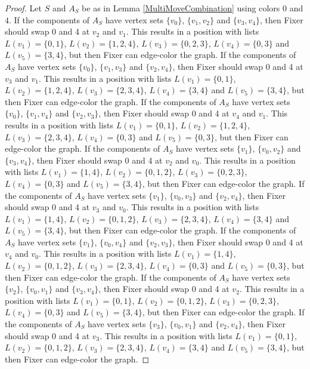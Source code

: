 \documentclass[12pt]{amsart}
\theoremstyle{plain}
\theoremstyle{definition}
\theoremstyle{remark}
\begin{document}
\begin{proof}
Let $S$ and $A_S$ be as in Lemma \ref{MultiMoveCombination} using colors $0$ and $4$. If the components of $A_S$ have vertex sets $\{v_0\}$, $\{v_1, v_2\}$ and $\{v_3, v_4\}$, then Fixer should swap 0 and 4 at $v_2$ and $v_1$. This results in a position with lists $L(v_1) = \{0, 1\}$, $L(v_2) = \{1, 2, 4\}$, $L(v_3) = \{0, 2, 3\}$, $L(v_4) = \{0, 3\}$ and $L(v_5) = \{3, 4\}$, but then Fixer can edge-color the graph.
If the components of $A_S$ have vertex sets $\{v_0\}$, $\{v_1, v_3\}$ and $\{v_2, v_4\}$, then Fixer should swap 0 and 4 at $v_3$ and $v_1$. This results in a position with lists $L(v_1) = \{0, 1\}$, $L(v_2) = \{1, 2, 4\}$, $L(v_3) = \{2, 3, 4\}$, $L(v_4) = \{3, 4\}$ and $L(v_5) = \{3, 4\}$, but then Fixer can edge-color the graph.
If the components of $A_S$ have vertex sets $\{v_0\}$, $\{v_1, v_4\}$ and $\{v_2, v_3\}$, then Fixer should swap 0 and 4 at $v_4$ and $v_1$. This results in a position with lists $L(v_1) = \{0, 1\}$, $L(v_2) = \{1, 2, 4\}$, $L(v_3) = \{2, 3, 4\}$, $L(v_4) = \{0, 3\}$ and $L(v_5) = \{0, 3\}$, but then Fixer can edge-color the graph.
If the components of $A_S$ have vertex sets $\{v_1\}$, $\{v_0, v_2\}$ and $\{v_3, v_4\}$, then Fixer should swap 0 and 4 at $v_2$ and $v_0$. This results in a position with lists $L(v_1) = \{1, 4\}$, $L(v_2) = \{0, 1, 2\}$, $L(v_3) = \{0, 2, 3\}$, $L(v_4) = \{0, 3\}$ and $L(v_5) = \{3, 4\}$, but then Fixer can edge-color the graph.
If the components of $A_S$ have vertex sets $\{v_1\}$, $\{v_0, v_3\}$ and $\{v_2, v_4\}$, then Fixer should swap 0 and 4 at $v_3$ and $v_0$. This results in a position with lists $L(v_1) = \{1, 4\}$, $L(v_2) = \{0, 1, 2\}$, $L(v_3) = \{2, 3, 4\}$, $L(v_4) = \{3, 4\}$ and $L(v_5) = \{3, 4\}$, but then Fixer can edge-color the graph.
If the components of $A_S$ have vertex sets $\{v_1\}$, $\{v_0, v_4\}$ and $\{v_2, v_3\}$, then Fixer should swap 0 and 4 at $v_4$ and $v_0$. This results in a position with lists $L(v_1) = \{1, 4\}$, $L(v_2) = \{0, 1, 2\}$, $L(v_3) = \{2, 3, 4\}$, $L(v_4) = \{0, 3\}$ and $L(v_5) = \{0, 3\}$, but then Fixer can edge-color the graph.
If the components of $A_S$ have vertex sets $\{v_2\}$, $\{v_0, v_1\}$ and $\{v_3, v_4\}$, then Fixer should swap 0 and 4 at $v_2$. This results in a position with lists $L(v_1) = \{0, 1\}$, $L(v_2) = \{0, 1, 2\}$, $L(v_3) = \{0, 2, 3\}$, $L(v_4) = \{0, 3\}$ and $L(v_5) = \{3, 4\}$, but then Fixer can edge-color the graph.
If the components of $A_S$ have vertex sets $\{v_3\}$, $\{v_0, v_1\}$ and $\{v_2, v_4\}$, then Fixer should swap 0 and 4 at $v_3$. This results in a position with lists $L(v_1) = \{0, 1\}$, $L(v_2) = \{0, 1, 2\}$, $L(v_3) = \{2, 3, 4\}$, $L(v_4) = \{3, 4\}$ and $L(v_5) = \{3, 4\}$, but then Fixer can edge-color the graph.

\end{proof}
\end{document}
